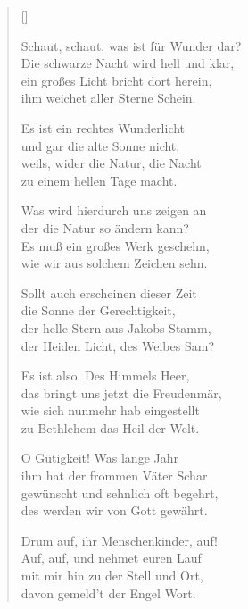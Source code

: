\begin{multicols}{2}
\settowidth{\versewidth}{Schaut, schaut, was ist für Wunder dar?}
\begin{verse}[\versewidth]
 
 Schaut, schaut, was ist für Wunder dar?\\
Die schwarze Nacht wird hell und klar,\\
ein großes Licht bricht dort herein,\\
ihm weichet aller Sterne Schein.
 
 Es ist ein rechtes Wunderlicht\\
und gar die alte Sonne nicht,\\
weils, wider die Natur, die Nacht\\
zu einem hellen Tage macht.
 
 Was wird hierdurch uns zeigen an\\
der die Natur so ändern kann?\\
Es muß ein großes Werk geschehn,\\
wie wir aus solchem Zeichen sehn.
 
 Sollt auch erscheinen dieser Zeit\\
die Sonne der Gerechtigkeit,\\
der helle Stern aus Jakobs Stamm,\\
der Heiden Licht, des Weibes Sam?
 
 Es ist also. Des Himmels Heer,\\
das bringt uns jetzt die Freudenmär,\\
wie sich nunmehr hab eingestellt\\
zu Bethlehem das Heil der Welt.
 
 O Gütigkeit! Was lange Jahr\\
ihm hat der frommen Väter Schar\\
gewünscht und sehnlich oft begehrt,\\
des werden wir von Gott gewährt.
 
 Drum auf, ihr Menschenkinder, auf!\\
Auf, auf, und nehmet euren Lauf\\
mit mir hin zu der Stell und Ort,\\
davon gemeld't der Engel Wort.
 

\end{verse}
\end{multicols}
